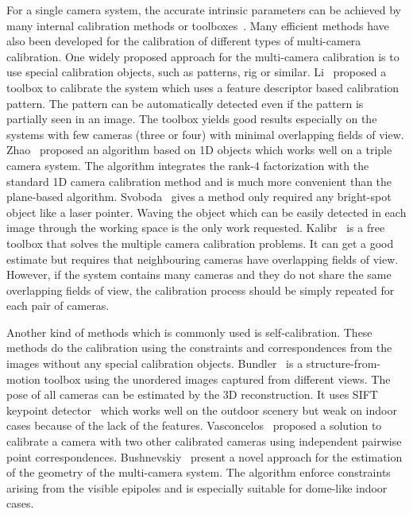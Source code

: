 \documentclass{article}
\begin{document}
For a single camera system, the accurate intrinsic parameters can be achieved by many internal calibration methods or toolboxes~\cite{zhang2000flexible,zhang2004camera}. Many efficient methods have also been developed for the calibration of different types of multi-camera calibration. One widely proposed approach for the multi-camera calibration is to use special calibration objects, such as  patterns, rig or similar. Li~\cite{Li2013A} proposed a toolbox to calibrate the system which uses a feature descriptor based calibration pattern. The pattern can be automatically detected even if the pattern is partially seen in an image. The toolbox yields good results especially on the systems with few cameras (three or four) with minimal overlapping fields of view. Zhao~\cite{zhao2008practical} proposed an algorithm based on 1D objects which works well on a triple camera system. The algorithm integrates the rank-4 factorization with the standard 1D camera calibration method and is much more convenient than the plane-based algorithm. Svoboda~\cite{svoboda2005convenient} gives a method only required any bright-spot object like a laser pointer. Waving the object which can be easily detected in each image through the working space is the only work requested. Kalibr~\cite{Maye2013Self} is a free toolbox that solves the multiple camera calibration problems. It can get a good estimate but requires that neighbouring cameras have overlapping fields of view. However, if the system contains many cameras and they do not share the same overlapping fields of view, the calibration process should be simply repeated for each pair of cameras.

Another kind of methods which is commonly used is self-calibration. These methods do the calibration using the constraints and correspondences from the images without any special calibration objects. Bundler~\cite{snavely2006photo} is a structure-from-motion toolbox using the unordered images captured from different views. The pose of all cameras can be estimated by the 3D reconstruction. It uses SIFT keypoint detector~\cite{lowe2004distinctive} which works well on the outdoor scenery but weak on indoor cases because of the lack of the features. Vasconcelos~\cite{vasconcelos2012minimal} proposed a solution to calibrate a camera with two other calibrated cameras using independent pairwise point correspondences. Bushnevskiy~\cite{bushnevskiy2016multicamera} present a novel approach for the estimation of the geometry of the multi-camera system. The algorithm enforce constraints arising from the visible epipoles and is especially suitable for dome-like indoor cases.
\end{document}
